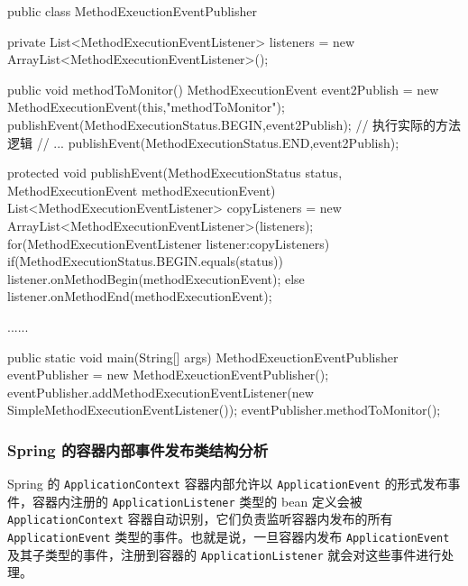 \begin{Java}
public class MethodExeuctionEventPublisher { 
    private List<MethodExecutionEventListener> listeners = new ArrayList<MethodExecutionEventListener>();  
    
    public void methodToMonitor()   {      
        MethodExecutionEvent event2Publish = new  MethodExecutionEvent(this,"methodToMonitor");      
        publishEvent(MethodExecutionStatus.BEGIN,event2Publish);  
        //  执行实际的方法逻辑    
        //  ...      
        publishEvent(MethodExecutionStatus.END,event2Publish);    
    }  

    protected void publishEvent(MethodExecutionStatus status, MethodExecutionEvent methodExecutionEvent) {     
        List<MethodExecutionEventListener> copyListeners = new ArrayList<MethodExecutionEventListener>(listeners);      
        for(MethodExecutionEventListener  listener:copyListeners) {        
            if(MethodExecutionStatus.BEGIN.equals(status))          
                listener.onMethodBegin(methodExecutionEvent);        
            else          
                listener.onMethodEnd(methodExecutionEvent);      
        }
    }

    ......

    public static void main(String[] args) {     
        MethodExeuctionEventPublisher eventPublisher = new  MethodExeuctionEventPublisher();     
        eventPublisher.addMethodExecutionEventListener(new SimpleMethodExecutionEventListener()); 
        eventPublisher.methodToMonitor();    
    }
}
\end{Java}

\subsubsection{Spring 的容器内部事件发布类结构分析}

Spring 的 \texttt{ApplicationContext} 容器内部允许以 \texttt{ApplicationEvent} 的形式发布事件，容器内注册的 \texttt{ApplicationListener} 类型的 bean 定义会被 \texttt{ApplicationContext} 容器自动识别，它们负责监听容器内发布的所有 \texttt{ApplicationEvent} 类型的事件。也就是说，一旦容器内发布 \texttt{ApplicationEvent} 及其子类型的事件，注册到容器的 \texttt{ApplicationListener} 就会对这些事件进行处理。

